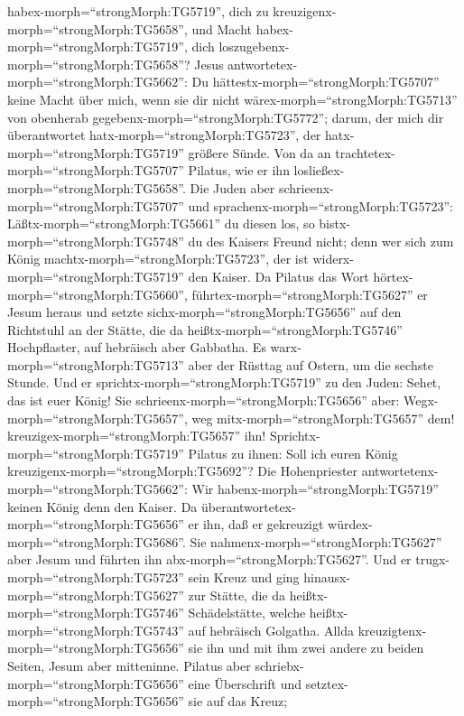 habex-morph=``strongMorph:TG5719'', dich zu
kreuzigenx-morph=``strongMorph:TG5658'', und Macht
habex-morph=``strongMorph:TG5719'', dich
loszugebenx-morph=``strongMorph:TG5658''?  Jesus
antwortetex-morph=``strongMorph:TG5662'': Du
hättestx-morph=``strongMorph:TG5707'' keine Macht über mich, wenn sie
dir nicht wärex-morph=``strongMorph:TG5713'' von obenherab
gegebenx-morph=``strongMorph:TG5772''; darum, der mich dir überantwortet
hatx-morph=``strongMorph:TG5723'', der hatx-morph=``strongMorph:TG5719''
größere Sünde.  Von da an
trachtetex-morph=``strongMorph:TG5707'' Pilatus, wie er ihn
losließex-morph=``strongMorph:TG5658''. Die Juden aber
schrieenx-morph=``strongMorph:TG5707'' und
sprachenx-morph=``strongMorph:TG5723'':
Läßtx-morph=``strongMorph:TG5661'' du diesen los, so
bistx-morph=``strongMorph:TG5748'' du des Kaisers Freund nicht; denn wer
sich zum König machtx-morph=``strongMorph:TG5723'', der ist
widerx-morph=``strongMorph:TG5719'' den Kaiser.  Da Pilatus
das Wort hörtex-morph=``strongMorph:TG5660'',
führtex-morph=``strongMorph:TG5627'' er Jesum heraus und setzte
sichx-morph=``strongMorph:TG5656'' auf den Richtstuhl an der Stätte, die
da heißtx-morph=``strongMorph:TG5746'' Hochpflaster, auf hebräisch aber
Gabbatha.  Es warx-morph=``strongMorph:TG5713'' aber der
Rüsttag auf Ostern, um die sechste Stunde. Und er
sprichtx-morph=``strongMorph:TG5719'' zu den Juden: Sehet, das ist euer
König!  Sie schrieenx-morph=``strongMorph:TG5656'' aber:
Wegx-morph=``strongMorph:TG5657'', weg mitx-morph=``strongMorph:TG5657''
dem! kreuzigex-morph=``strongMorph:TG5657'' ihn!
Sprichtx-morph=``strongMorph:TG5719'' Pilatus zu ihnen: Soll ich euren
König kreuzigenx-morph=``strongMorph:TG5692''? Die Hohenpriester
antwortetenx-morph=``strongMorph:TG5662'': Wir
habenx-morph=``strongMorph:TG5719'' keinen König denn den Kaiser.
 Da überantwortetex-morph=``strongMorph:TG5656'' er ihn,
daß er gekreuzigt würdex-morph=``strongMorph:TG5686''. Sie
nahmenx-morph=``strongMorph:TG5627'' aber Jesum und führten ihn
abx-morph=``strongMorph:TG5627''.  Und er
trugx-morph=``strongMorph:TG5723'' sein Kreuz und ging
hinausx-morph=``strongMorph:TG5627'' zur Stätte, die da
heißtx-morph=``strongMorph:TG5746'' Schädelstätte, welche
heißtx-morph=``strongMorph:TG5743'' auf hebräisch Golgatha.
 Allda kreuzigtenx-morph=``strongMorph:TG5656'' sie ihn und
mit ihm zwei andere zu beiden Seiten, Jesum aber mitteninne.
 Pilatus aber schriebx-morph=``strongMorph:TG5656'' eine
Überschrift und setztex-morph=``strongMorph:TG5656'' sie auf das Kreuz;
